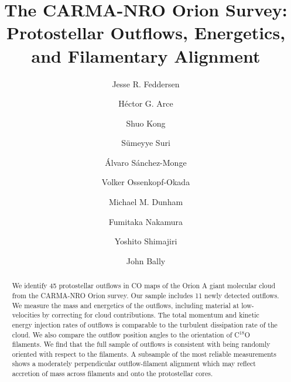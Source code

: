 \documentclass[twocolumn]{aastex63}
\newcommand{\numnew}{11}
\begin{document}
\title{The CARMA-NRO Orion Survey: Protostellar Outflows, Energetics, and Filamentary Alignment}

\author{Jesse R. Feddersen}
\author{H\'ector G. Arce}
\author{Shuo Kong}
\author{S\"umeyye Suri}
\author{\'Alvaro S\'anchez-Monge}
\author{Volker Ossenkopf-Okada}
\author{Michael M. Dunham}
\author{Fumitaka Nakamura}
\author{Yoshito Shimajiri}
\author{John Bally}

\begin{abstract}
We identify 45 protostellar outflows in CO maps of the Orion A giant molecular cloud from the CARMA-NRO Orion survey. Our sample includes \numnew{} newly detected outflows. We measure the mass and energetics of the outflows, including material at low-velocities by correcting for cloud contributions. The total momentum and kinetic energy injection rates of outflows is comparable to the turbulent dissipation rate of the cloud. We also compare the outflow position angles to the orientation of C$^{18}$O filaments. We find that the full sample of outflows is consistent with being randomly oriented with respect to the filaments. A subsample of the most reliable measurements shows a moderately perpendicular outflow-filament alignment which may reflect accretion of mass across filaments and onto the protostellar cores.
\end{abstract}

\end{document}
